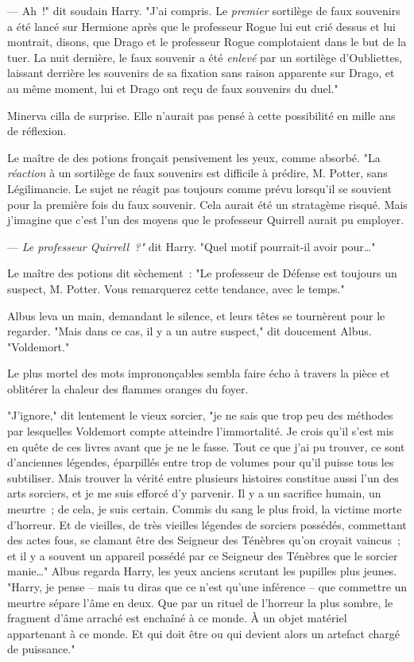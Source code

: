 --- Ah~!" dit soudain Harry. "J'ai compris. Le \emph{premier} sortilège de faux souvenirs a été lancé sur Hermione après que le professeur Rogue lui eut crié dessus et lui montrait, disons, que Drago et le professeur Rogue complotaient dans le but de la tuer. La nuit dernière, le faux souvenir a été \emph{enlevé} par un sortilège d'Oubliettes, laissant derrière les souvenirs de sa fixation sans raison apparente sur Drago, et au même moment, lui et Drago ont reçu de faux souvenirs du duel."

Minerva cilla de surprise. Elle n'aurait pas pensé à cette possibilité en mille ans de réflexion.

Le maître de des potions fronçait pensivement les yeux, comme absorbé. "La \emph{réaction} à un sortilège de faux souvenirs est difficile à prédire, M. Potter, sans Légilimancie. Le sujet ne réagit pas toujours comme prévu lorsqu'il se souvient pour la première fois du faux souvenir. Cela aurait été un stratagème risqué. Mais j'imagine que c'est l'un des moyens que le professeur Quirrell aurait pu employer.

--- \emph{Le professeur Quirrell~?"} dit Harry. "Quel motif pourrait-il avoir pour…"

Le maître des potions dit sèchement~: "Le professeur de Défense est toujours un suspect, M. Potter. Vous remarquerez cette tendance, avec le temps."

Albus leva un main, demandant le silence, et leurs têtes se tournèrent pour le regarder. "Mais dans ce cas, il y a un autre suspect," dit doucement Albus. "Voldemort."

Le plus mortel des mots imprononçables sembla faire écho à travers la pièce et oblitérer la chaleur des flammes oranges du foyer.

"J'ignore," dit lentement le vieux sorcier, "je ne sais que trop peu des méthodes par lesquelles Voldemort compte atteindre l'immortalité. Je crois qu'il s'est mis en quête de ces livres avant que je ne le fasse. Tout ce que j'ai pu trouver, ce sont d'anciennes légendes, éparpillés entre trop de volumes pour qu'il puisse tous les subtiliser. Mais trouver la vérité entre plusieurs histoires constitue aussi l'un des arts sorciers, et je me suis efforcé d'y parvenir. Il y a un sacrifice humain, un meurtre~; de cela, je suis certain. Commis du sang le plus froid, la victime morte d'horreur. Et de vieilles, de très vieilles légendes de sorciers possédés, commettant des actes fous, se clamant être des Seigneur des Ténèbres qu'on croyait vaincus~; et il y a souvent un appareil possédé par ce Seigneur des Ténèbres que le sorcier manie…" Albus regarda Harry, les yeux anciens scrutant les pupilles plus jeunes. "Harry, je pense -- mais tu diras que ce n'est qu'une inférence -- que commettre un meurtre sépare l'âme en deux. Que par un rituel de l'horreur la plus sombre, le fragment d'âme arraché est enchaîné à ce monde. À un objet matériel appartenant à ce monde. Et qui doit être ou qui devient alors un artefact chargé de puissance."

